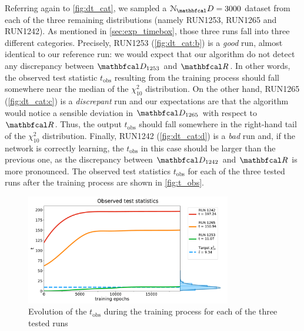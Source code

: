Referring again to \autoref{fig:dt_cat}, we sampled a $\mathcal{N}_\D = 3000$ dataset from each of the three remaining
distributions (namely RUN1253, RUN1265 and RUN1242). As mentioned in \autoref{sec:exp_timebox}, those three runs fall
into three different categories. Precisely,  RUN1253 (\autoref{fig:dt_cat:b}) is a \textit{good} run, almost identical
to our reference run: we would expect that our algorithm do not detect any discrepancy between $\D_{1253}$ and $\R$. In
other words, the observed test statistic $t_{\text{obs}}$ resulting from the training process should fall somewhere near
the median of the $\chi^2_{10}$ distribution. On the other hand, RUN1265 (\autoref{fig:dt_cat:c}) is a
\textit{discrepant} run and our expectations are that the algorithm would notice a sensible deviation in $\D_{1265}$
with respect to $\R$. Thus, the output $t_{\text{obs}}$ should fall somewhere in the right-hand tail of the
$\chi^2_{10}$ distribution. Finally, RUN1242 (\autoref{fig:dt_cat:d}) is a \textit{bad} run and, if the network is
correctly learning, the $t_{\text{obs}}$ in this case should be larger than the previous one, as the discrepancy between
$\D_{1242}$ and $\R$ is more pronounced. The observed test statistics $t_{\text{obs}}$ for each of the three tested runs
after the training process are shown in \autoref{fig:t_obs}. 


\begin{figure}[t]
    \centering
    \includegraphics[width=0.8\textwidth]{../PLOTS/DRIFT_TIME/thesis/t_all_advanced.pdf}
    \caption{Evolution of the $t_{\text{obs}}$ during the training process for each of the three tested runs}
    \label{fig:t_obs}
\end{figure}

